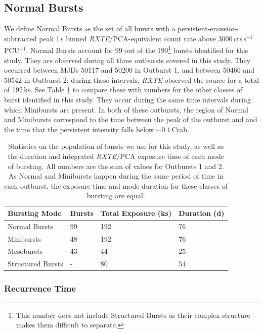 \subsection{Normal Bursts}

\par We define Normal Bursts as the set of all bursts with a persistent-emission-subtracted peak 1\,s binned \textit{RXTE}/PCA-equivalent count rate above 3000\,cts\,s$^{-1}$\,PCU$^{-1}$.  Normal Bursts account for 99 out of the 190\footnote{This number does not include Structured Bursts as their complex structure makes them difficult to separate.} bursts identified for this study.  They are observed during all three outbursts covered in this study.  They occurred between MJDs 50117 and 50200 in Outburst 1, and between 50466 and 50542 in Outburst 2; during these intervals, \textit{RXTE} observed the source for a total of 192\,ks.  See Table \ref{tab:staretimes} to compare these with numbers for the other classes of burst identified in this study.  They occur during the same time intervals during which Minibursts are present.  In both of these outbursts, the region of Normal and Minibursts correspond to the time between the peak of the outburst and and the time that the persistent intensity falls below $\sim0.1$\,Crab.

\begin{table}
\centering
\begin{tabular}{llll}
\hline
\hline
\scriptsize  Bursting Mode &\scriptsize Bursts &\scriptsize Total Exposure (ks) &\scriptsize Duration (d) \\
\hline
Normal Bursts & 99  & 192 & 76\\
Minibursts & 48 & 192  & 76\\
Mesobursts & 43 &44 &25\\
Structured Bursts & - &80 &54 \\
\hline
\hline
\end{tabular}
\caption{Statistics on the population of bursts we use for this study, as well as the duration and integrated \textit{RXTE}/PCA exposure time of each mode of bursting.  All numbers are the sum of values for Outbursts 1 and 2.  As Normal and Minibursts happen during the same period of time in each outburst, the exposure time and mode duration for these classes of bursting are equal.}
\label{tab:staretimes}
\end{table}

\subsubsection{Recurrence Time}

